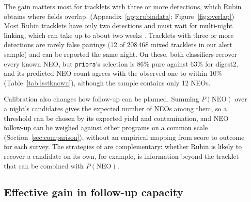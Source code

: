 \documentclass[linenumbers,twocolumn]{aastex701}
\newcommand{\priora}{{\tt priora}\xspace} %
\begin{document}
The gain matters most for tracklets with three or more detections, which
Rubin obtains where fields overlap. (Appendix~\ref{app:rubindata}; Figure~\ref{fig:overlap}) Most Rubin tracklets have only two
detections and must wait for multi-night linking, which can take up to
about two weeks \citep{wagg2025}. Tracklets with three or more detections
are rarely false pairings (12 of 208\,468 mixed tracklets in our alert
sample) and can be reported the same night. On these, both classifiers recover every known NEO, but \priora's selection
is 86\% pure against 63\% for digest2, and its predicted NEO count agrees
with the observed one to within 10\% (Table~\ref{tab:lsstknown}), although
the sample contains only 12 NEOs.

Calibration also changes how follow-up can be planned. Summing
$P(\mathrm{NEO})$ over a night's candidates gives the expected number of
NEOs among them, so a threshold can be chosen by its expected yield and
contamination, and NEO follow-up can be weighed against other programs on
a common scale (Section~\ref{sec:comparison}), without an empirical mapping
from score to outcome for each survey. The strategies of \citet{wagg2025}
are complementary: whether Rubin is likely to recover a candidate on its
own, for example, is information beyond the tracklet that can be combined
with $P(\mathrm{NEO})$.

\subsection{Effective gain in follow-up capacity}
\label{sec:capacity}
\end{document}
